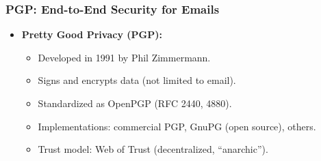 \subsubsection{PGP: End-to-End Security for Emails}
\begin{itemize}
    \item \textbf{Pretty Good Privacy (PGP):}
    \begin{itemize}
        \item Developed in 1991 by Phil Zimmermann.
        \item Signs and encrypts data (not limited to email).
        \item Standardized as OpenPGP (RFC 2440, 4880).
        \item Implementations: commercial PGP, GnuPG (open source), others.
        \item Trust model: Web of Trust (decentralized, ``anarchic'').
    \end{itemize}
    

\end{itemize}
